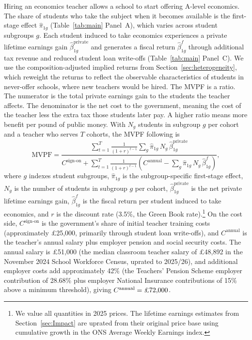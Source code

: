Hiring an economics teacher allows a school to start offering A-level economics. The share of students who take the subject when it becomes available is the first-stage effect $\hat{\pi}_{1g}$ (Table~\ref{tab:main} Panel~A), which varies across student subgroups $g$. Each student induced to take economics experiences a private lifetime earnings gain $\hat{\beta}_{1g}^{\text{private}}$ and generates a fiscal return $\hat{\beta}_{1g}^{f}$ through additional tax revenue and reduced student loan write-offs (Table~\ref{tab:main} Panel~C). We use the composition-adjusted implied returns from Section~\ref{sec:heterogeneity}, which reweight the returns to reflect the observable characteristics of students in never-offer schools, where new teachers would be hired. The MVPF is a ratio. The numerator is the total private earnings gain to the students the teacher affects. The denominator is the net cost to the government, meaning the cost of the teacher less the extra tax those students later pay. A higher ratio means more benefit per pound of public money. With $N_g$ students in subgroup $g$ per cohort and a teacher who serves $T$ cohorts, the MVPF following \citet{hendren2020mvpf} is
%
\begin{equation}
\label{eq:mvpf}
\text{MVPF}
    = \frac{\sum_{t=1}^{T} \frac{1}{(1+r)^{t-1}}
            \sum_{g} \hat{\pi}_{1g} \, N_g \,
            \hat{\beta}_{1g}^{\text{private}}}
           {C^{\text{sign-on}}
            + \sum_{t=1}^{T} \frac{1}{(1+r)^{t-1}}
            \left(
            C^{\text{annual}}
            - \sum_{g} \hat{\pi}_{1g} \, N_g \,
            \hat{\beta}_{1g}^{f}
            \right)},
\end{equation}
%
where $g$ indexes student subgroups, $\hat{\pi}_{1g}$ is the subgroup-specific first-stage effect, $N_g$ is the number of students in subgroup $g$ per cohort, $\hat{\beta}_{1g}^{\text{private}}$ is the net private lifetime earnings gain, $\hat{\beta}_{1g}^{f}$ is the fiscal return per student induced to take economics, and $r$ is the discount rate (3.5\%, the Green Book rate).\footnote{We value all quantities in 2025 prices. The lifetime earnings estimates from Section~\ref{sec:Impact} are uprated from their original price base using cumulative growth in the ONS Average Weekly Earnings index.} On the cost side, $C^{\text{sign-on}}$ is the government's share of initial teacher training costs (approximately \pounds 25,000, primarily through student loan write-offs), and $C^{\text{annual}}$ is the teacher's annual salary plus employer pension and social security costs. The annual salary is \pounds 51,000 (the median classroom teacher salary of \pounds 48,892 in the November 2024 School Workforce Census, uprated to 2025/26), and additional employer costs add approximately 42\% (the Teachers' Pension Scheme employer contribution of 28.68\% plus employer National Insurance contributions of 15\% above a minimum threshold), giving $C^{\text{annual}} = \text{\pounds 72,000}$.

